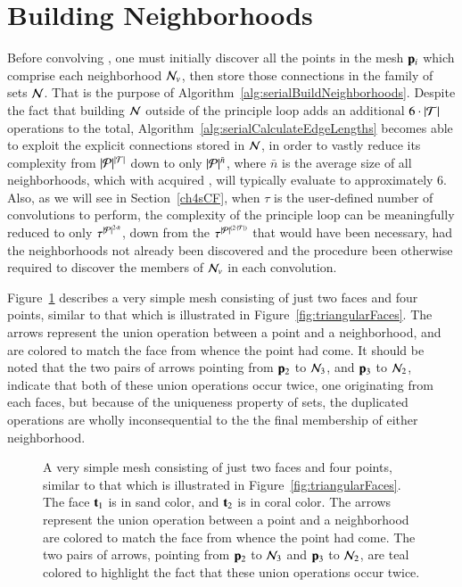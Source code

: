 %
%
%
%
\section{Building Neighborhoods}
\label{ch4sBN}
Before convolving , one must initially discover all the points in the mesh $\mathbf{p}_i$ which comprise each neighborhood $\mathcal{N}_v$, then store those connections in the family of sets $\mathcal{N}$. That is the purpose of Algorithm~\ref{alg:serialBuildNeighborhoods}. Despite the fact that building $\mathcal{N}$ outside of the principle loop adds an additional $6\cdot|\mathcal{T}|$ operations to the total, Algorithm~\ref{alg:serialCalculateEdgeLengths} becomes able to exploit the explicit connections stored in $\mathcal{N}$, in order to vastly reduce its complexity from $|\mathcal{P}|^{|\mathcal{T}|}$ down to only $|\mathcal{P}|^{\bar{n}}$, where $\bar{n}$ is the average size of all neighborhoods, which with acquired \tdd{}, will typically evaluate to approximately 6. Also, as we will see in Section~\ref{ch4sCF}, when $\tau$ is the user-defined number of convolutions to perform, the complexity of the principle loop can be meaningfully reduced to only $\tau^{|\mathcal{P}|^{2\cdot\bar{n}}}$, down from the $\tau^{|\mathcal{P}|^{(2\cdot|\mathcal{T}|)}}$ that would have been necessary, had the neighborhoods not already been discovered and the procedure been otherwise required to discover the members of $\mathcal{N}_v$ in each convolution.%
%

Figure~\ref{fig:unionsOfSimpleBuildNeighborhoods} describes a very simple mesh consisting of just two faces and four points, similar to that which is illustrated in Figure~\ref{fig:triangularFaces}. The arrows represent the union operation between a point and a neighborhood, and are colored to match the face from whence the point had come. It should be noted that the two pairs of arrows pointing from $\mathbf{p}_2$ to $\mathcal{N}_3$, and $\mathbf{p}_3$ to $\mathcal{N}_2$, indicate that both of these union operations occur twice, one originating from each faces, but because of the uniqueness property of sets, the duplicated operations are wholly inconsequential to the the final membership of either neighborhood.

\begin{figure}[ht]
	
	{\caption[Union Operations as Performed in Build Neighborhoods]{A very simple mesh consisting of just two faces and four points, similar to that which is illustrated in Figure~\ref{fig:triangularFaces}. The face $\mathbf{t}_1$ is in sand color, and $\mathbf{t}_2$ is in coral color. The arrows represent the union operation between a point and a neighborhood are colored to match the face from whence the point had come. The two pairs of arrows, pointing from $\mathbf{p}_2$ to $\mathcal{N}_3$ and $\mathbf{p}_3$ to $\mathcal{N}_2$, are teal colored to highlight the fact that these union operations occur twice.
}\label{fig:unionsOfSimpleBuildNeighborhoods}}
\end{figure}

